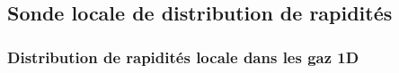 %
%
%
%
% 



\subsection{Sonde locale de distribution de rapidités}


\subsubsection{Distribution de rapidités locale dans les gaz 1D}


